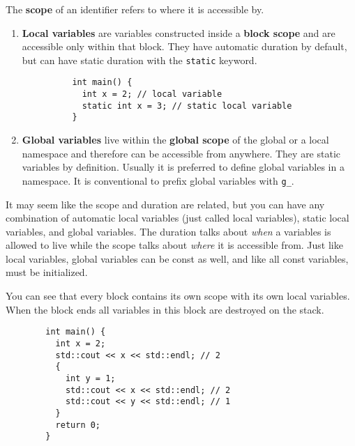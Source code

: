 \documentclass{article}
\begin{document}
    \begin{definition}[Scope]
      The \textbf{scope} of an identifier refers to where it is accessible by. 
      \begin{enumerate}
        \item \textbf{Local variables} are variables constructed inside a \textbf{block scope} and are accessible only within that block. They have automatic duration by default, but can have static duration with the \texttt{static} keyword. 

        \begin{lstlisting}
          int main() {
            int x = 2; // local variable 
            static int x = 3; // static local variable
          }
        \end{lstlisting}

        \item \textbf{Global variables} live within the \textbf{global scope} of the global or a local namespace and therefore can be accessible from anywhere. They are static variables by definition. Usually it is preferred to define global variables in a namespace. It is conventional to prefix global variables with \texttt{g\_}. 
      \end{enumerate}
    \end{definition} 

    It may seem like the scope and duration are related, but you can have any combination of automatic local variables (just called local variables), static local variables, and global variables. The duration talks about \textit{when} a variables is allowed to live while the scope talks about \textit{where} it is accessible from. Just like local variables, global variables can be const as well, and like all const variables, must be initialized. 

    \begin{example}
      You can see that every block contains its own scope with its own local variables. When the block ends all variables in this block are destroyed on the stack. 

      \begin{lstlisting}
        int main() {  
          int x = 2; 
          std::cout << x << std::endl; // 2
          {
            int y = 1;
            std::cout << x << std::endl; // 2
            std::cout << y << std::endl; // 1
          }
          return 0; 
        }
        
      \end{lstlisting}
    \end{example}
\end{document}
